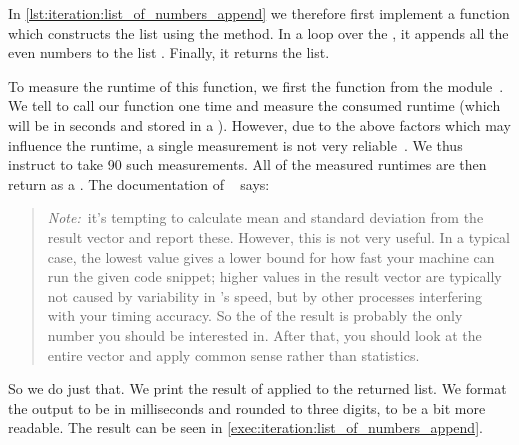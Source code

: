 In \cref{lst:iteration:list_of_numbers_append} we therefore first implement a function  which constructs the list using the  method.
In a loop over the , it appends all the even numbers to the list .
Finally, it returns the list.

To measure the runtime of this function, we first  the function  from the module~.
We tell  to call our function  one time and measure the consumed runtime (which will be in seconds and stored in a ).
However, due to the above factors which may influence the runtime, a single measurement is not very reliable~\cite{P2002AI}.
We thus instruct  to take 90 such measurements.
All of the measured runtimes are then return as a .
The documentation of ~\cite{PSF2024TMETOSCS} says:%
%
\begin{quote}%
\emph{Note:}~it's tempting to calculate mean and standard deviation from the result vector and report these.
However, this is not very useful.
In a typical case, the lowest value gives a lower bound for how fast your machine can run the given code snippet;
higher values in the result vector are typically not caused by variability in \python's speed, but by other processes interfering with your timing accuracy.
So the  of the result is probably the only number you should be interested in.
After that, you should look at the entire vector and apply common sense rather than statistics.%
\end{quote}%
%
%
%
So we do just that.
We print the result of  applied to the returned list.
We format the output to be in milliseconds and rounded to three digits, to be a bit more readable.
The result can be seen in \cref{exec:iteration:list_of_numbers_append}.

